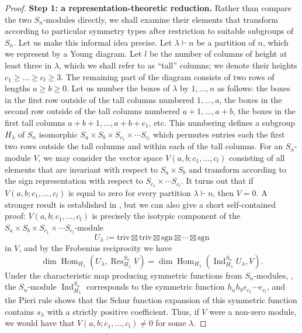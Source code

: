 \documentclass[11pt,reqno]{amsart}
\theoremstyle{plain}
\theoremstyle{definition}
\theoremstyle{remark}
\DeclareMathOperator{\Hom}{Hom}
\DeclareMathOperator{\Ind}{Ind}
\DeclareMathOperator{\Res}{Res}
\begin{document}
\begin{proof}
\textbf{Step 1: a representation-theoretic reduction. } 
Rather than compare the two $S_n$-modules directly, we shall examine their elements that transform according to particular symmetry types after restriction to suitable subgroups of $S_n$. Let us make this informal idea precise. Let $\lambda\vdash n$ be a partition of $n$, which we represent by a Young diagram. Let $l$ be the number of columns of height at least three in $\lambda$, which we shall refer to as ``tall'' columns; we denote their heights $c_1\ge \ldots\ge c_l\ge 3$. The remaining part of the diagram consists of two rows of lengths $a\ge b\ge 0$. Let us number the boxes of $\lambda$ by $1,\ldots, n$ as follows: the boxes in the first row outside of the tall columns numbered $1,\ldots,a$, the boxes in the second row outside of the tall columns numbered $a+1,\ldots,a+b$, the boxes in the first tall columns $a+b+1,\ldots,a+b+c_1$, etc. This numbering defines a subgroup $H_\lambda$ of $S_n$ isomorphic $S_a\times S_b\times S_{c_1}\times \cdots S_{c_l}$ which permutes entries each the first two rows outside the tall columns and within each of the tall columns. For an $S_n$-module $V$, we may consider the vector space $V(a,b;c_1,\ldots,c_l)$ consisting of all elements that are invariant with respect to $S_a\times S_b$ and transform according to the sign representation with respect to $S_{c_1}\times \cdots S_{c_l}$. It turns out that if $V(a,b;c_1,\ldots,c_l)$ is equal to zero for every partition $\lambda\vdash n$, then $V=0$.
A stronger result is established in \cite[Lemma 1]{Mo}, but we can also give a short self-contained proof: $V(a,b;c_1,\ldots,c_l)$ is precisely the isotypic component of the $S_a\times S_b\times S_{c_1}\times \cdots S_{c_l}$-module
 \[
U_\lambda:=\mathrm{triv}\boxtimes\mathrm{triv}\boxtimes\mathrm{sgn}\boxtimes\cdots\boxtimes\mathrm{sgn}     
 \]  
in $V$, and by the Frobenius reciprocity we have
 \[
\dim\Hom_{H_\lambda}(U_\lambda,\Res_{H_\lambda}^{S_n}V)= 
\dim\Hom_{H_\lambda}(\Ind_{H_\lambda}^{S_n}U_\lambda,V). 
 \]
Under the characteristic map producing symmetric functions from $S_n$-modules, \cite[Sec.~I.7]{MR3443860}, the $S_n$-module $\Ind_{H_\lambda}^{S_n}$ corresponds to the symmetric function $h_ah_be_{c_1}\cdots e_{c_l}$, and the Pieri rule \cite[Sec.~I.5]{MR3443860} shows that the Schur function expansion of this symmetric function contains $s_\lambda$ with a strictly positive coefficient. Thus, if $V$ were a non-zero module, we would have that $V(a,b;c_1,\ldots,c_l)\ne 0$ for some $\lambda$. 


\end{proof}
\end{document}

